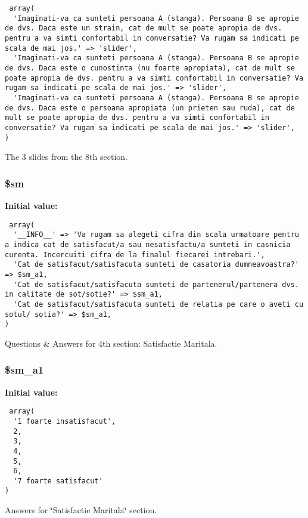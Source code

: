\begin{Code}\begin{verbatim} array(
  'Imaginati-va ca sunteti persoana A (stanga). Persoana B se apropie de dvs. Daca este un strain, cat de mult se poate apropia de dvs. pentru a va simti confortabil in conversatie? Va rugam sa indicati pe scala de mai jos.' => 'slider',
  'Imaginati-va ca sunteti persoana A (stanga). Persoana B se apropie de dvs. Daca este o cunostinta (nu foarte apropiata), cat de mult se poate apropia de dvs. pentru a va simti confortabil in conversatie? Va rugam sa indicati pe scala de mai jos.' => 'slider',
  'Imaginati-va ca sunteti persoana A (stanga). Persoana B se apropie de dvs. Daca este o persoana apropiata (un prieten sau ruda), cat de mult se poate apropia de dvs. pentru a va simti confortabil in conversatie? Va rugam sa indicati pe scala de mai jos.' => 'slider',
)
\end{verbatim}\end{Code}
The 3 slides from the 8th section. 

\subsubsection{\setlength{\rightskip}{0pt plus 5cm}\$sm}\label{d1/d7c/a00003_63c3cc2a072df683705d4c1b0a8b86b4}


\textbf{Initial value:}

\begin{Code}\begin{verbatim} array(
  '__INFO__' => 'Va rugam sa alegeti cifra din scala urmatoare pentru a indica cat de satisfacut/a sau nesatisfactu/a sunteti in casnicia curenta. Incercuiti cifra de la finalul fiecarei intrebari.',
  'Cat de satisfacut/satisfacuta sunteti de casatoria dumneavoastra?' => $sm_a1,
  'Cat de satisfacut/satisfacuta sunteti de partenerul/partenera dvs. in calitate de sot/sotie?' => $sm_a1,
  'Cat de satisfacut/satisfacuta sunteti de relatia pe care o aveti cu sotul/ sotia?' => $sm_a1,
)
\end{verbatim}\end{Code}
Questions \& Answers for 4th section: Satisfactie Maritala. 

\subsubsection{\setlength{\rightskip}{0pt plus 5cm}\$sm\_\-a1}\label{d1/d7c/a00003_497e514872967bb7a656de14654619f5}


\textbf{Initial value:}

\begin{Code}\begin{verbatim} array(
  '1 foarte insatisfacut',
  2,
  3,
  4,
  5,
  6,
  '7 foarte satisfacut'
)
\end{verbatim}\end{Code}
Answers for \char`\"{}Satisfactie Maritala\char`\"{} section. 

